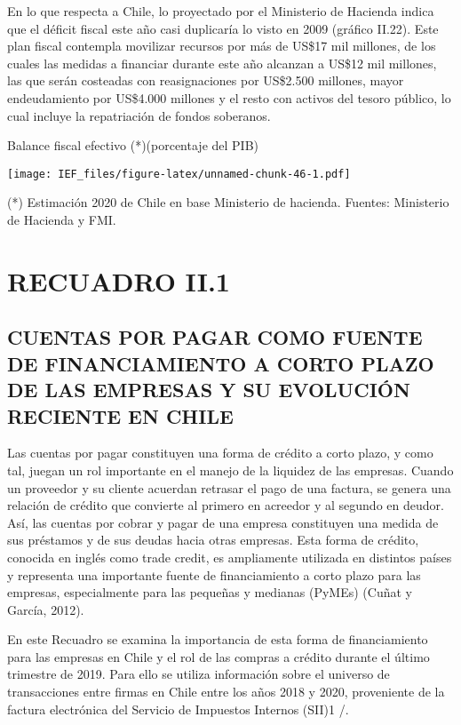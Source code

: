 \documentclass[
]{book}
\begin{document}
En lo que respecta a Chile, lo proyectado por el Ministerio de Hacienda indica
que el déficit fiscal este año casi duplicaría lo visto en 2009 (gráfico II.22).
Este plan fiscal contempla movilizar recursos por más de US\$17 mil millones,
de los cuales las medidas a financiar durante este año alcanzan a US\$12 mil
millones, las que serán costeadas con reasignaciones por US\$2.500 millones,
mayor endeudamiento por US\$4.000 millones y el resto con activos del tesoro
público, lo cual incluye la repatriación de fondos soberanos.

Balance fiscal efectivo (*)(porcentaje del PIB)

\texttt{[image: IEF\_files/figure-latex/unnamed-chunk-46-1.pdf]}

(*) Estimación 2020 de Chile en base Ministerio de hacienda.
Fuentes: Ministerio de Hacienda y FMI.

\hypertarget{REC2.1}{%
\section*{RECUADRO II.1}\label{REC2.1}}

\hypertarget{REC2.11}{%
\subsection*{CUENTAS POR PAGAR COMO FUENTE DE FINANCIAMIENTO A CORTO PLAZO DE LAS EMPRESAS Y SU EVOLUCIÓN RECIENTE EN CHILE}\label{REC2.11}}

Las cuentas por pagar constituyen una forma de crédito a corto
plazo, y como tal, juegan un rol importante en el manejo de
la liquidez de las empresas. Cuando un proveedor y su cliente
acuerdan retrasar el pago de una factura, se genera una relación
de crédito que convierte al primero en acreedor y al segundo
en deudor. Así, las cuentas por cobrar y pagar de una empresa
constituyen una medida de sus préstamos y de sus deudas
hacia otras empresas. Esta forma de crédito, conocida en inglés
como trade credit, es ampliamente utilizada en distintos países
y representa una importante fuente de financiamiento a corto
plazo para las empresas, especialmente para las pequeñas y
medianas (PyMEs) (Cuñat y García, 2012).

En este Recuadro se examina la importancia de esta forma de
financiamiento para las empresas en Chile y el rol de las compras
a crédito durante el último trimestre de 2019. Para ello se utiliza
información sobre el universo de transacciones entre firmas en
Chile entre los años 2018 y 2020, proveniente de la factura
electrónica del Servicio de Impuestos Internos (SII)1
/.
\end{document}
